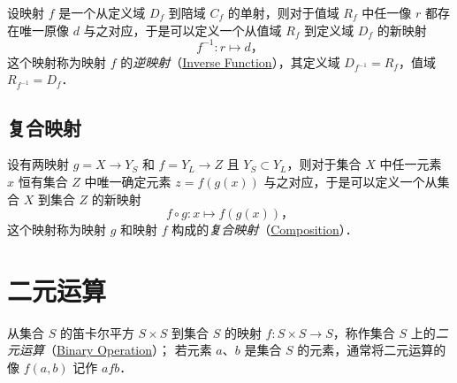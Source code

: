 设映射 $f$ 是一个从定义域 $D_f$ 到陪域 $C_f$ 的单射，则对于值域 $R_f$ 中任一像 $r$ 都存在唯一原像 $d$ 与之对应，于是可以定义一个从值域 $R_f$ 到定义域 $D_f$ 的新映射
\[
f^{-1}: r \mapsto d \text{，}
\]
这个映射称为映射 $f$ 的\emph{逆映射}（\href{http://mathworld.wolfram.com/InverseFunction.html}{Inverse Function}），其定义域 $D_{f^{-1}}=R_f$，值域 $R_{f^{-1}}=D_f$．

\subsection{复合映射}

设有两映射 $g=X\to{}Y_S$ 和 $f=Y_L\to{}Z$ 且 $Y_S\subset{}Y_L$，则对于集合 $X$ 中任一元素 $x$ 恒有集合 $Z$ 中唯一确定元素 $z=f(g(x))$ 与之对应，于是可以定义一个从集合 $X$ 到集合 $Z$ 的新映射
\[
f \circ g: x \mapsto f(g(x)) \text{，}
\]
这个映射称为映射 $g$ 和映射 $f$ 构成的\emph{复合映射}（\href{http://mathworld.wolfram.com/Composition.html}{Composition}）．

\newpage
\section{二元运算}

从集合 $S$ 的笛卡尔平方 $S\times{}S$ 到集合 $S$ 的映射 $f:S\times{}S\to{}S$，称作集合 $S$ 上的\emph{二元运算}（\href{http://mathworld.wolfram.com/BinaryOperation.html}{Binary Operation}）；
若元素 $a$、$b$ 是集合 $S$ 的元素，通常将二元运算的像 $f(a, b)$ 记作 $a f b$．


